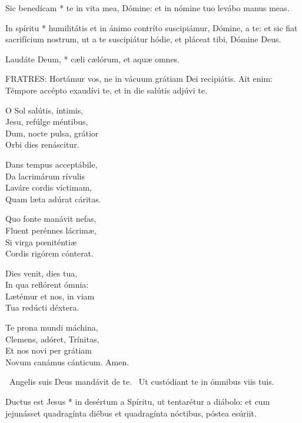  Sic benedícam * te in vita mea, Dómine: et in nómine tuo levábo manus meas.

 In spíritu * humilitátis et in ánimo contríto suscipiámur, Dómine, a te: et sic fiat sacrifícium nostrum, ut a te suscipiátur hódie, et pláceat tibi, Dómine Deus.

 Laudáte Deum, * cæli cælórum, et aquæ omnes.


\lettrine[lines=2]{F}{RATRES}: Hortámur vos, ne in vácuum grátiam Dei recipiátis. Ait enim: Témpore accépto exaudívi te, et in die salútis adjúvi te.


\lettrine[lines=2]{O}{} Sol salútis, íntimis,\\
Jesu, refúlge méntibus,\\
Dum, nocte pulsa, grátior\\
Orbi dies renáscitur.

Dans tempus acceptábile,\\
Da lacrimárum rívulis\\
Laváre cordis víctimam,\\
Quam læta adúrat cáritas.

Quo fonte manávit nefas,\\
Fluent perénnes lácrimæ,\\
Si virga pœniténtiæ\\
Cordis rigórem cónterat.

Dies venit, dies tua,\\
In qua reflórent ómnia:\\
Lætémur et nos, in viam\\
Tua redúcti déxtera.


Te prona mundi máchina,\\
Clemens, adóret, Trínitas,\\
Et nos novi per grátiam\\
Novum canámus cánticum. Amen.

\V\ Angelis suis Deus mandávit de te. \R\ Ut custódiant te in ómnibus viis tuis.

 Ductus est Jesus * in desértum a Spíritu, ut tentarétur a diábolo: et cum jejunásset quadragínta diébus et quadragínta nóctibus, póstea esúriit.


